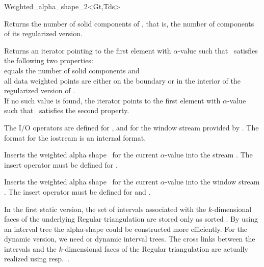 \begin{ccClassTemplate} {Weighted_alpha_shape_2<Gt,Tds>}

{Returns the number of solid components of \ccVar, that is, the number of components of its regularized version.}

{Returns an iterator pointing to the first element with $\alpha$-value
such that \ccVar\ satisfies the following two properties:\\
 equals the number of solid components and \\
all data weighted points are either on the boundary or in the interior of the regularized version of \ccVar.\\
If no such value is found, the iterator points to the first element with 
$\alpha$-value such that \ccVar\ satisfies the second property.}

The I/O operators are defined for , and for
the window stream provided by \cgal. The format for the iostream
is an internal format. 


{Inserts the weighted alpha shape \ccVar\ for the current $\alpha$-value into the stream .
\ccPrecond The insert operator must be defined for .}


{Inserts the weighted alpha shape \ccVar\ for the current $\alpha$-value into the window stream .
\ccPrecond The insert operator must be defined for  and .}
\end{ccClassTemplate}

\ccImplementation
In the first static version, the set of intervals associated with the
$k$-dimensional faces of the underlying Regular triangulation are
stored only as sorted . By using an interval tree the
alpha-shape could be constructed more efficiently. For the dynamic
version, we need  or dynamic interval trees. The
cross links between the intervals and the $k$-dimensional faces of the
Regular triangulation are actually realized using
 resp.\ .

